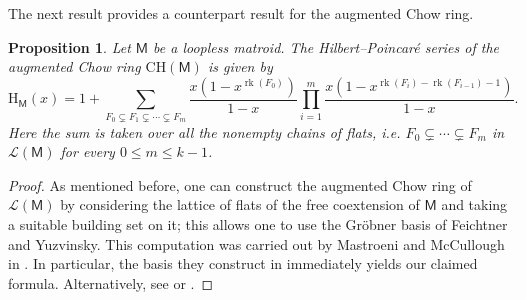 \documentclass[11pt, a4paper, english]{amsart}
\theoremstyle{teoremas}
\newtheorem{proposition}[theorem]{Proposition}
\theoremstyle{definition}
\DeclareMathOperator{\rk}{rk}
\newcommand{\M}{\mathsf{M}}
\renewcommand{\H}{\mathrm{H}}
\newcommand{\CH}{\mathrm{CH}}
\begin{document}
The next result provides a counterpart result for the augmented Chow ring.

\begin{proposition}\label{prop:hilbert-augmented-chow}
    Let $\M$ be a loopless matroid. The Hilbert--Poincar\'e series of the augmented Chow ring $\CH(\M)$ is given by
        \[ \H_{\M}(x) = 1+\sum_{F_0 \subsetneq F_1 \subsetneq \cdots \subsetneq F_m} \frac{x(1-x^{\rk(F_0)})}{1-x} \prod_{i=1}^m \frac{x(1- x^{\rk(F_i)-\rk(F_{i-1})-1})}{1-x}.\]
    Here the sum is taken over all the nonempty chains of flats, i.e. $F_0\subsetneq \cdots \subsetneq F_m$ in $\mathcal{L}(\M)$ for every $0\leq m\leq k-1$.
\end{proposition}

\begin{proof}
    As mentioned before, one can construct the augmented Chow ring of $\mathcal{L}(\M)$ by considering the lattice of flats of the free coextension of $\M$ and taking a suitable building set on it; this allows one to use the Gr\"obner basis of Feichtner and Yuzvinsky. This computation was carried out by Mastroeni and McCullough in \cite[Section~5.1]{mastroeni-mccullough}. In particular, the basis they construct in \cite[Corollary~5.4]{mastroeni-mccullough} immediately yields our claimed formula. Alternatively, see \cite[Lemma~7.8]{stellahedral} or \cite[Corollary~3.12]{liao}.
\end{proof}
\end{document}
